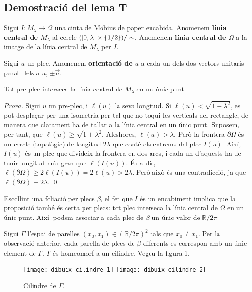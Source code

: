 \subsection{Demostració del lema T}
\begin{defi}
    Sigui $I:M_\lambda\to\Omega$ una cinta de Möbius de paper encabida. 
    Anomenem \textbf{línia central de $M_\lambda$} al cercle $([0,\lambda]\times\{1/2\})/\sim$.
    Anomenem \textbf{línia central de $\Omega$} a la imatge de la línia central de $M_\lambda$ per $I$.
\end{defi}

\begin{defi}
    Sigui $u$ un plec. Anomenem \textbf{orientació de $u$} a cada un dels dos vectors unitaris paral·lels a $u$, $\pm \vec u$.
\end{defi}

\begin{prop}
    Tot pre-plec interseca la línia central de $M_\lambda$ en un únic punt.
\end{prop}
{
    \color{black}
    \textit{Prova.}
    Sigui $u$ un pre-plec, i $\ell(u)$ la seva longitud. Si $\ell(u)<\sqrt{1+\lambda^2}$, es pot desplaçar per una isometria per tal que no toqui les verticals del rectangle, de manera que clarament ha de tallar a la línia central en un únic punt.
    Suposem, per tant, que $\ell(u)\geq\sqrt{1+\lambda^2}$. Aleshores, $\ell(u)>\lambda$. Però la frontera $\partial \Omega$ és un cercle (topològic) de longitud $2\lambda$ que conté els extrems del plec $I(u)$. Així, $I(u)$ és un plec que divideix la frontera en dos arcs, i cada un d'aquests ha de tenir longitud més gran que $\ell(I(u))$. És a dir, $\ell(\partial \Omega) \ge  2\ell(I(u)) = 2\ell(u)>2\lambda$. Però això és una contradicció, ja que $\ell(\partial \Omega) = 2\lambda$.
    \qed
}
\begin{obs}
    Escollint una foliació per plecs $\beta$, el fet que $I$ és un encabiment implica que la proposició també és certa per plecs: tot plec interseca la línia central de $\Omega$ en un únic punt. Així, podem associar a cada plec de $\beta$ un únic valor de $\mathbb R/2\pi$
\end{obs}

Sigui $\Gamma$ l'espai de parelles $(x_0,x_1)\in(\mathbb R/2\pi)^2$ tals que $x_0\neq x_1$. Per la observació anterior, cada parella de plecs de $\beta$ diferents es correspon amb un únic element de $\Gamma$. $\Gamma$ és homeomorf a un cilindre. Vegeu la figura \ref{fig:cilindre}.

\begin{figure}[htbp]
    \centering
    \texttt{[image: dibuix\_cilindre\_1]}
    \raisebox{5\height}{$\quad\quad\Large\cong\quad$}
    \texttt{[image: dibuix\_cilindre\_2]}
    \caption{Cilindre de $\Gamma$.}
    \label{fig:cilindre}
\end{figure}


